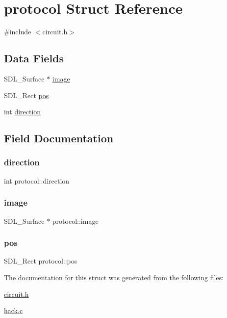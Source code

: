 \hypertarget{structprotocol}{}\section{protocol Struct Reference}
\label{structprotocol}


{\ttfamily \#include $<$circuit.\+h$>$}

\subsection*{Data Fields}
\begin{DoxyCompactItemize}
\item 
S\+D\+L\+\_\+\+Surface $\ast$ \hyperlink{structprotocol_a83d0768fd8d86396078d1b0b28b3d56c}{image}
\item 
S\+D\+L\+\_\+\+Rect \hyperlink{structprotocol_ad65a80eae3e7e0769fc6483fc31f5f88}{pos}
\item 
int \hyperlink{structprotocol_aa90a08ca51e428e67134a86fd03c7acd}{direction}
\end{DoxyCompactItemize}


\subsection{Field Documentation}
\mbox{\label{structprotocol_aa90a08ca51e428e67134a86fd03c7acd}} 
\subsubsection{\texorpdfstring{direction}{direction}}
{\footnotesize\ttfamily int protocol\+::direction}

\mbox{\label{structprotocol_a83d0768fd8d86396078d1b0b28b3d56c}} 
\subsubsection{\texorpdfstring{image}{image}}
{\footnotesize\ttfamily S\+D\+L\+\_\+\+Surface $\ast$ protocol\+::image}

\mbox{\label{structprotocol_ad65a80eae3e7e0769fc6483fc31f5f88}} 
\subsubsection{\texorpdfstring{pos}{pos}}
{\footnotesize\ttfamily S\+D\+L\+\_\+\+Rect protocol\+::pos}



The documentation for this struct was generated from the following files\+:\begin{DoxyCompactItemize}
\item 
\hyperlink{circuit_8h}{circuit.\+h}\item 
\hyperlink{hack_8c}{hack.\+c}\end{DoxyCompactItemize}
